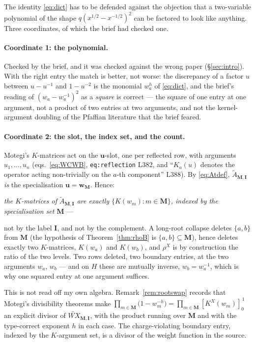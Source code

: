 \documentclass[11pt]{article}
\theoremstyle{plain}
\theoremstyle{definition}
\theoremstyle{remark}
\theoremstyle{plain}
\newcommand{\bI}{\mathbf{I}}
\newcommand{\bM}{\mathbf{M}}
\newcommand{\bu}{\mathbf{u}}
\newcommand{\bw}{\mathbf{w}}
\newcommand{\At}{\widetilde{A}}
\begin{document}
The identity \eqref{eq:dict} has to be defended against the objection that a
two-variable polynomial of the shape $q(x^{1/2}-x^{-1/2})^2$ can be factored to
look like anything.  Three coordinates, of which the brief had checked one.

\paragraph{Coordinate 1: the polynomial.}
Checked by the brief, and it was checked against the wrong paper
(\S\ref{sec:intro}).  With the right entry the match is better, not worse: the
discrepancy of a factor $u$ between $u-u^{-1}$ and $1-u^{-2}$ is the monomial
$w_a^{h}$ of \eqref{eq:dict}, and the brief's reading of
$(w_a-w_a^{-1})^2$ as a \emph{square} is correct --- the square of one entry at
one argument, not a product of two entries at two arguments, and not the
kernel-argument doubling of the Pfaffian literature that the brief feared.

\paragraph{Coordinate 2: the slot, the index set, and the count.}
Motegi's $K$-matrices act on the $\bu$-slot, one per reflected row, with
arguments $u_1,\dots,u_n$ (eqs.\ \eqref{eq:WCWB}, \texttt{eq:reflection} L382,
and ``$K_a(u)$ denotes the operator acting non-trivially on the $a$-th
component'' L388).  By \eqref{eq:Atdef}, $\At_{\bM,\bI}$ \emph{is} the
specialisation $\bu=\bw_{\bM}$.  Hence:
\begin{center}
\emph{the $K$-matrices of $\At_{\bM,\bI}$ are exactly $\{K(w_m):m\in\bM\}$,
indexed by the specialisation set $\bM$} ---
\end{center}
not by the label $\bI$, and not by the complement.  A long-root collapse deletes
$\{a,b\}$ from $\bM$ (the hypothesis of Theorem~\ref{thm:rhoB} is
$\{a,b\}\subseteq\bM$), hence deletes exactly two $K$-matrices, $K(w_a)$ and
$K(w_b)$, and $\rho^X$ is by construction the ratio of the two levels.  Two rows
deleted, two boundary entries, at the two arguments $w_a$, $w_b$ --- and on $H$
these are mutually inverse, $w_b=w_a^{-1}$, which is why one squared entry at
one argument suffices.

This is not read off my own algebra.  Remark~\ref{rem:rootswap} records that
Motegi's divisibility theorems make
$\prod_{m\in\bM}\bigl(1-w_m^{-h}\bigr)
=\prod_{m\in\bM}[K^X(w_m)]_0^{\,1}$
an explicit divisor of $\widetilde{WX}_{\bM,\bI}$, with the product running over
$\bM$ and with the type-correct exponent $h$ in each case.  The charge-violating
boundary entry, indexed by the $K$-argument set, is a divisor of the weight
function in the source.
\end{document}
